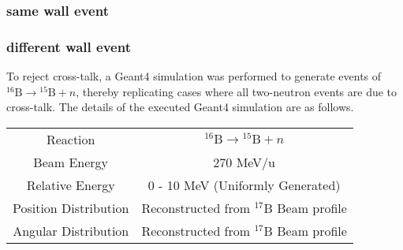 \subsubsection{same wall event}

\subsubsection{different wall event}


To reject cross-talk, a Geant4 simulation was performed to generate events of ${}^{16}\text{B} \to {}^{15}\text{B}+n$, thereby replicating cases where all two-neutron events are due to cross-talk. The details of the executed Geant4 simulation are as follows.

\begin{center}
    \begin{tabular}[h]{c|c}
        \hline \hline
        Reaction & ${}^{16}\text{B} \to {}^{15}\text{B}+n$ \\
        Beam Energy & 270 MeV/u\\
        Relative Energy & 0 - 10 MeV (Uniformly Generated)\\
        Position Distribution & Reconstructed from ${}^{17}$B Beam profile\\
        Angular Distribution & Reconstructed from ${}^{17}$B Beam profile \\
        \hline \hline
    \end{tabular}
\end{center}

